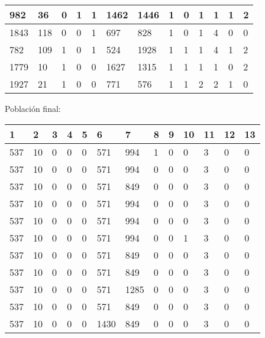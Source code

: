 \begin{table}[H]
\begin{tabular}{|l|l|l|l|l|l|l|l|l|l|l|l|l|}
982  &  36  &  0  &  1  &  1  &  1462  &  1446  &  1  &  0  &  1  &  1  &  1  &  2 \\ \hline
1843  &  118  &  0  &  0  &  1  &  697  &  828  &  1  &  0  &  1  &  {\color[HTML]{FE0000}4}  &  0  &  0 \\ \hline
782  &  109  &  1  &  0  &  1  &  524  &  1928  &  1  &  1  &  1  &  {\color[HTML]{FE0000}4}  &  1  &  2 \\ \hline
1779  &  10  &  1  &  0  &  0  &  1627  &  1315  &  1  &  1  &  1  &  1  &  0  &  2 \\ \hline
1927  &  21  &  1  &  0  &  0  &  771  &  576  &  1  &  1  &  2  &  2  &  1  &  0 \\ \hline
\end{tabular}
\end{table}
Población final:
\begin{table}[H]
\begin{tabular}{|l|l|l|l|l|l|l|l|l|l|l|l|l|}
\hline
\textbf{1} & \textbf{2} & \textbf{3} & \textbf{4} & \textbf{5} & \textbf{6} & \textbf{7} & \textbf{8} & \textbf{9} & \textbf{10} & \textbf{11} & \textbf{12} & \textbf{13} \\ \hline
537  &  10  &  0  &  0  &  0  &  571  &  994  &  1  &  0  &  0  &  3  &  0  &  0 \\ \hline
537  &  10  &  0  &  0  &  0  &  571  &  994  &  0  &  0  &  0  &  3  &  0  &  0 \\ \hline
537  &  10  &  0  &  0  &  0  &  571  &  849  &  0  &  0  &  0  &  3  &  0  &  0 \\ \hline
537  &  10  &  0  &  0  &  0  &  571  &  994  &  0  &  0  &  0  &  3  &  0  &  0 \\ \hline
537  &  10  &  0  &  0  &  0  &  571  &  994  &  0  &  0  &  0  &  3  &  0  &  0 \\ \hline
537  &  10  &  0  &  0  &  0  &  571  &  994  &  0  &  0  &  1  &  3  &  0  &  0 \\ \hline
537  &  10  &  0  &  0  &  0  &  571  &  849  &  0  &  0  &  0  &  3  &  0  &  0 \\ \hline
537  &  10  &  0  &  0  &  0  &  571  &  849  &  0  &  0  &  0  &  3  &  0  &  0 \\ \hline
537  &  10  &  0  &  0  &  0  &  571  &  1285  &  0  &  0  &  0  &  3  &  0  &  0 \\ \hline
537  &  10  &  0  &  0  &  0  &  571  &  849  &  0  &  0  &  0  &  3  &  0  &  0 \\ \hline
537  &  10  &  0  &  0  &  0  &  1430  &  849  &  0  &  0  &  0  &  3  &  0  &  0 \\ \hline

\end{tabular}
\end{table}
